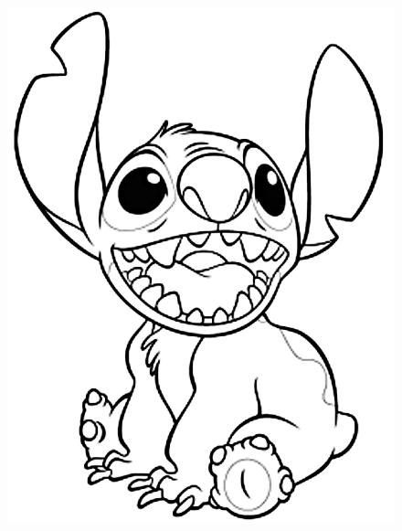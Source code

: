 \documentclass[10pt]{article}
\begin{document}
\begin{figure}

\centering
\begin{minipage}[t]{.49\textwidth}
\centering
\vspace{0pt}
    \includegraphics[scale=0.3]{disney.jpg}
    \label{fig:cornerdet}
\end{minipage}
\begin{minipage}[t]{.5\textwidth}
\centering
\vspace{0pt}

\end{minipage}
\end{figure}
\end{document}
